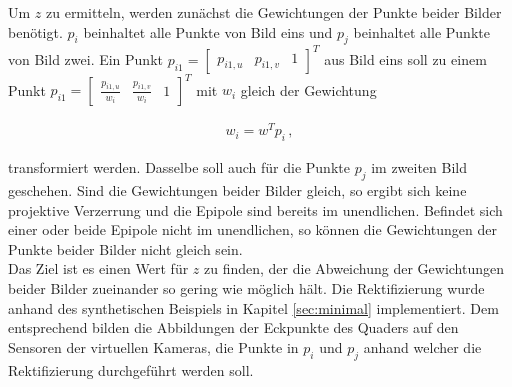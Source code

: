 %


%
%

Um $z$ zu ermitteln, werden zunächst die Gewichtungen der Punkte beider Bilder benötigt. $p_i$ beinhaltet alle Punkte von Bild eins und $p_j$ beinhaltet alle Punkte von Bild zwei. Ein Punkt  $p_{i1} = \begin{bmatrix}p_{i1,u}&p_{i1,v}&1\end{bmatrix}^T$ aus Bild eins soll zu einem Punkt $p_{i1} = \begin{bmatrix}\frac{p_{i1,u}}{w_i}&\frac{p_{i1,v}}{w_i}&1\end{bmatrix}^T$ mit $w_i$ gleich der Gewichtung 

\begin{gather}
	w_i=w^Tp_i  \, ,
\end{gather} 

transformiert werden. Dasselbe soll auch für die Punkte $p_j$ im zweiten Bild geschehen. Sind die Gewichtungen beider Bilder gleich, so ergibt sich keine projektive Verzerrung und die Epipole sind bereits im unendlichen. Befindet sich einer oder beide Epipole nicht im unendlichen, so können die Gewichtungen der Punkte beider Bilder nicht gleich sein\cite{ZZ}.\\

Das Ziel ist es einen Wert für $z$ zu finden, der die Abweichung der Gewichtungen beider Bilder zueinander so gering wie möglich hält. Die Rektifizierung wurde anhand des synthetischen Beispiels in Kapitel \ref{sec:minimal} implementiert. Dem entsprechend bilden die Abbildungen der Eckpunkte des Quaders auf den Sensoren der virtuellen Kameras, die Punkte in $p_i$ und $p_j$ anhand welcher die Rektifizierung durchgeführt werden soll. \\

